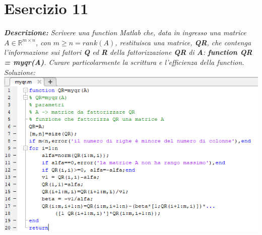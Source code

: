 \section{Esercizio 11}
\textit{\textbf{Descrizione:} Scrivere una function Matlab che, data in ingresso una matrice $A \in \mathbb{R}^{m\times n}$, con $m \geq n = rank(A)$, restituisca una matrice, \textbf{QR}, che contenga l'informazione sui fattori \textbf{Q} ed \textbf{R} della fattorizzazione \textbf{QR} di \textbf{A}: \textbf{function QR = myqr(A)}. Curare particolarmente la scrittura e l'efficienza della function.}\newline
\noindent\emph{Soluzione: }\newline
\includegraphics[width=1.3\linewidth]{img/myqr.png}\newpage